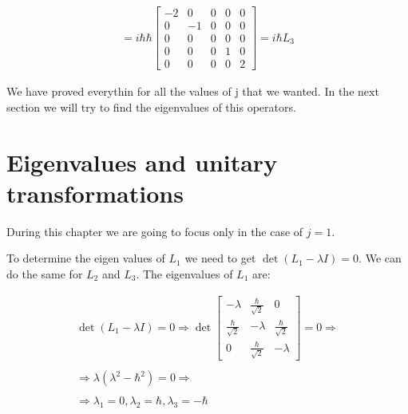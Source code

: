 \begin{equation}
\begin{array}{c}
    \\
    = i \hbar \hbar\left[\begin{matrix}
      -2 & 0 & 0 & 0 & 0\\
      0 & -1 & 0 & 0 & 0\\
      0 & 0 & 0 & 0 & 0\\
      0 & 0 & 0 & 1 & 0\\
      0 & 0 & 0 & 0 & 2
    \end{matrix}\right] = i \hbar L_3
  \end{array}
\end{equation}

We have proved everythin for all the values of j that we wanted. In the next section we will try to find the eigenvalues of this operators.


\section{Eigenvalues and unitary transformations}

During this chapter we are going to focus only in the case of $j=1$.


To determine the eigen values of $L_1$ we need to get $\det(L_1-\lambda I) = 0$. We can do the same for $L_2$ and $L_3$. The eigenvalues of $L_1$ are:

\begin{equation}
  \begin{array}{c}
    \det(L_1-\lambda I) = 0 \Rightarrow
    \det\left[\begin{matrix}
      -\lambda & \frac{\hbar}{\sqrt{2}} & 0\\
      \frac{\hbar}{\sqrt{2}} & -\lambda & \frac{\hbar}{\sqrt{2}}\\
      0 & \frac{\hbar}{\sqrt{2}} & -\lambda
    \end{matrix}\right] = 0 \Rightarrow
    \\

    \\
    \Rightarrow \lambda\left(\lambda^2-\hbar^2\right) = 0 \Rightarrow
    \\

    \\
    \Rightarrow \lambda_1 = 0, \lambda_2 = \hbar, \lambda_3 = -\hbar
  \end{array}
\end{equation}

